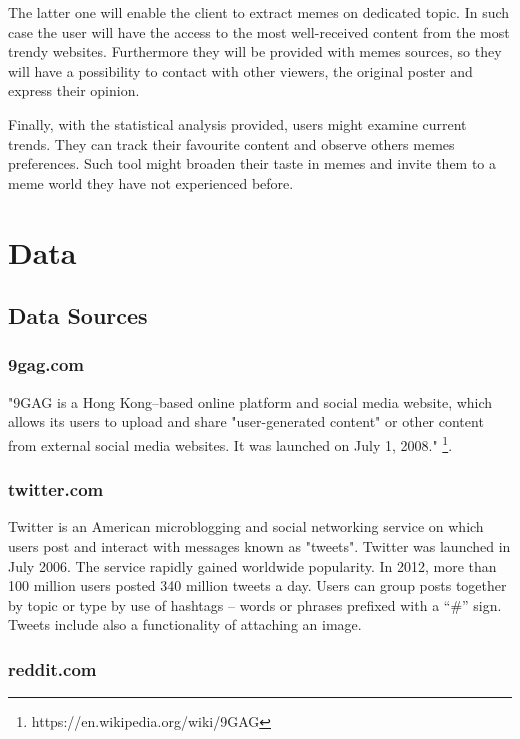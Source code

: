 \documentclass{article}
\begin{document}
The latter one will enable the client to extract memes on dedicated topic. In such case the user will have the access to the most well-received content from the most trendy websites. Furthermore they will be provided with memes sources, so they will have a possibility to contact with other viewers, the original poster and express their opinion. 

Finally, with the statistical analysis provided, users might examine current trends. They can track their favourite content and observe others memes preferences. Such tool might broaden their taste in memes and invite them to a meme world they have not experienced before. 


\section{Data}
\subsection{Data Sources}
\subsubsection{9gag.com}
"9GAG is a Hong Kong–based online platform and social media website, which allows its users to upload and share "user-generated content" or other content from external social media websites. It was launched on July 1, 2008." \footnote{https://en.wikipedia.org/wiki/9GAG}. 


\subsubsection{twitter.com}
Twitter is an American microblogging and social networking service on which users post and interact with messages known as "tweets". Twitter was launched in July 2006. The service rapidly gained worldwide popularity. In 2012, more than 100 million users posted 340 million tweets a day. Users can group posts together by topic or type by use of hashtags – words or phrases prefixed with a “\#” sign. Tweets include also a functionality of attaching an image.

\subsubsection{reddit.com}
\end{document}
